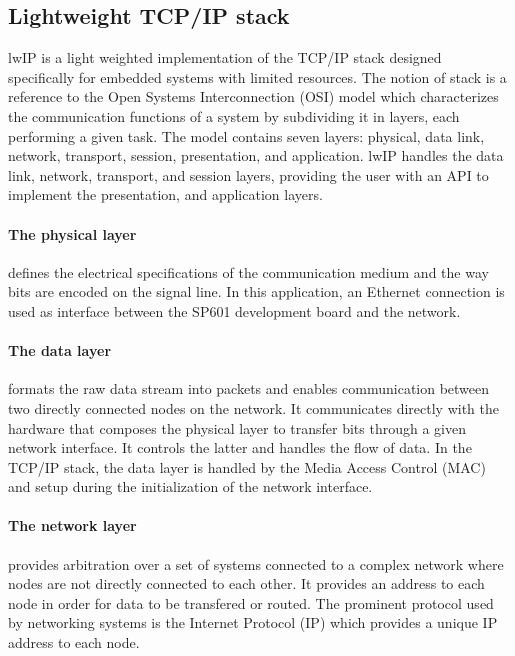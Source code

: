     \subsection{Lightweight TCP/IP stack}

      lwIP is a light weighted implementation of the TCP/IP stack designed specifically for embedded systems with limited resources. The notion of stack is a reference to the Open Systems Interconnection (OSI) model which characterizes the communication functions of a system by subdividing it in layers, each performing a given task. The model contains seven layers: physical, data link, network, transport, session, presentation, and application. lwIP handles the data link, network, transport, and session layers, providing the user with an API to implement the presentation, and application layers.

      \paragraph{The physical layer} defines the electrical specifications of the communication medium and the way bits are encoded on the signal line. In this application, an Ethernet connection is used as interface between the SP601 development board and the network.

      \paragraph{The data layer} formats the raw data stream into packets and enables communication between two directly connected nodes on the network. It communicates directly with the hardware that composes the physical layer to transfer bits through a given network interface. It controls the latter and handles the flow of data. In the TCP/IP stack, the data layer is handled by the Media Access Control (MAC) and setup during the initialization of the network interface.

      \paragraph{The network layer} provides arbitration over a set of systems connected to a complex network where nodes are not directly connected to each other. It provides an address to each node in order for data to be transfered or routed. The prominent protocol used by networking systems is the Internet Protocol (IP) which provides a unique IP address to each node.

